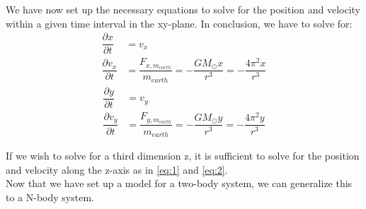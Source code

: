 \documentclass[12pt]{article}
\newcommand{\Ms}{M_\odot}
\begin{document}
	 We have now set up the necessary equations to solve for the position and velocity within a given time interval in the xy-plane. In conclusion, we have to solve for:
	 \begin{equation}\label{eq:6}
	 \begin{aligned}
	 \dfrac{\partial x}{\partial t} &= v_{x} \\ 
	 \dfrac{\partial v_{x}}{\partial t} &= \dfrac{F_{x,m_{earth}}}{m_{earth}} = 
	 - \dfrac{G\Ms x}{r^3} = - \dfrac{4\pi^2 x}{r^3} 
	 \end{aligned}
	 \end{equation} 
	 \begin{equation}\label{eq:7}
	 \begin{aligned}
	 \dfrac{\partial y}{\partial t} &= v_{y} \\ 
	 \dfrac{\partial v_{y}}{\partial t} &= \dfrac{F_{y,m_{earth}}}{m_{earth}} = - \dfrac{G\Ms y}{r^3} =- \dfrac{4\pi^2 y}{r^3} 
	 \end{aligned}
	 \end{equation}
	 
	 If we wish to solve for a third dimension z, it is sufficient to solve for the position and velocity along the z-axis as in \ref*{eq:1} and \ref*{eq:2}. \\
	 Now that we have set up a model for a two-body system, we can generalize this to a N-body system. 
\end{document}
